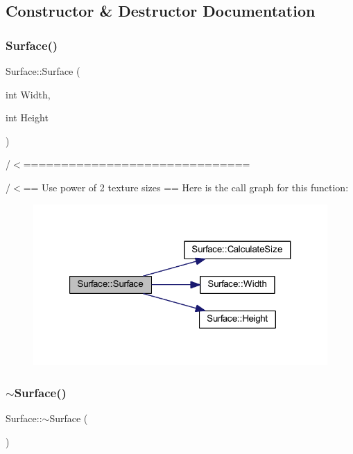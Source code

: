 \subsection{Constructor \& Destructor Documentation}
\mbox{\label{class_surface_a323ba9165c8635e84eb0c490fe88d846}} 
\subsubsection{\texorpdfstring{Surface()}{Surface()}}
{\footnotesize\ttfamily Surface\+::\+Surface (\begin{DoxyParamCaption}\item[{int}]{Width,  }\item[{int}]{Height }\end{DoxyParamCaption})}



/$<$============================== 

/$<$== Use power of 2 texture sizes == Here is the call graph for this function\+:
\nopagebreak
\begin{figure}[H]
\begin{center}
\leavevmode
\includegraphics[width=321pt]{class_surface_a323ba9165c8635e84eb0c490fe88d846_cgraph}
\end{center}
\end{figure}
\mbox{\label{class_surface_a89de75c95cb550d432f3ea4ed1429db0}} 
\subsubsection{\texorpdfstring{$\sim$\+Surface()}{~Surface()}}
{\footnotesize\ttfamily Surface\+::$\sim$\+Surface (\begin{DoxyParamCaption}{ }\end{DoxyParamCaption})}



